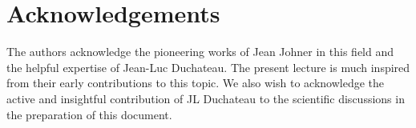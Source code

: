 \section*{Acknowledgements}
The authors acknowledge the pioneering works of Jean Johner in this field and the helpful expertise of Jean-Luc Duchateau. The present lecture is much inspired from their early contributions to this topic.
We also wish to acknowledge the active and insightful contribution of JL Duchateau to the scientific discussions in the preparation of this document.

